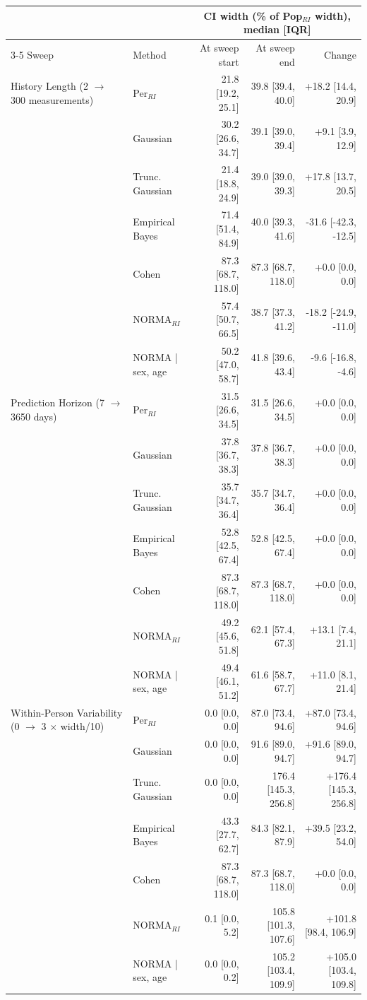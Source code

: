 \begin{table}[ht]
\centering
\footnotesize
\begin{tabular}{llrrr}
\toprule
\multicolumn{2}{l}{} & \multicolumn{3}{c}{CI width (\% of Pop$_{RI}$ width), median [IQR]} \\
\cmidrule(lr){3-5}
Sweep & Method & At sweep start & At sweep end & Change \\
\midrule
History Length (2 $\to$ 300 measurements) & Per$_{RI}$ & 21.8 [19.2, 25.1] & 39.8 [39.4, 40.0] & +18.2 [14.4, 20.9] \\
 & Gaussian & 30.2 [26.6, 34.7] & 39.1 [39.0, 39.4] & +9.1 [3.9, 12.9] \\
 & Trunc. Gaussian & 21.4 [18.8, 24.9] & 39.0 [39.0, 39.3] & +17.8 [13.7, 20.5] \\
 & Empirical Bayes & 71.4 [51.4, 84.9] & 40.0 [39.3, 41.6] & -31.6 [-42.3, -12.5] \\
 & Cohen & 87.3 [68.7, 118.0] & 87.3 [68.7, 118.0] & +0.0 [0.0, 0.0] \\
 & NORMA$_{RI}$ & 57.4 [50.7, 66.5] & 38.7 [37.3, 41.2] & -18.2 [-24.9, -11.0] \\
 & NORMA | sex, age & 50.2 [47.0, 58.7] & 41.8 [39.6, 43.4] & -9.6 [-16.8, -4.6] \\
\addlinespace
Prediction Horizon (7 $\to$ 3650 days) & Per$_{RI}$ & 31.5 [26.6, 34.5] & 31.5 [26.6, 34.5] & +0.0 [0.0, 0.0] \\
 & Gaussian & 37.8 [36.7, 38.3] & 37.8 [36.7, 38.3] & +0.0 [0.0, 0.0] \\
 & Trunc. Gaussian & 35.7 [34.7, 36.4] & 35.7 [34.7, 36.4] & +0.0 [0.0, 0.0] \\
 & Empirical Bayes & 52.8 [42.5, 67.4] & 52.8 [42.5, 67.4] & +0.0 [0.0, 0.0] \\
 & Cohen & 87.3 [68.7, 118.0] & 87.3 [68.7, 118.0] & +0.0 [0.0, 0.0] \\
 & NORMA$_{RI}$ & 49.2 [45.6, 51.8] & 62.1 [57.4, 67.3] & +13.1 [7.4, 21.1] \\
 & NORMA | sex, age & 49.4 [46.1, 51.2] & 61.6 [58.7, 67.7] & +11.0 [8.1, 21.4] \\
\addlinespace
Within-Person Variability (0 $\to$ 3 $\times$ width/10) & Per$_{RI}$ & 0.0 [0.0, 0.0] & 87.0 [73.4, 94.6] & +87.0 [73.4, 94.6] \\
 & Gaussian & 0.0 [0.0, 0.0] & 91.6 [89.0, 94.7] & +91.6 [89.0, 94.7] \\
 & Trunc. Gaussian & 0.0 [0.0, 0.0] & 176.4 [145.3, 256.8] & +176.4 [145.3, 256.8] \\
 & Empirical Bayes & 43.3 [27.7, 62.7] & 84.3 [82.1, 87.9] & +39.5 [23.2, 54.0] \\
 & Cohen & 87.3 [68.7, 118.0] & 87.3 [68.7, 118.0] & +0.0 [0.0, 0.0] \\
 & NORMA$_{RI}$ & 0.1 [0.0, 5.2] & 105.8 [101.3, 107.6] & +101.8 [98.4, 106.9] \\
 & NORMA | sex, age & 0.0 [0.0, 0.2] & 105.2 [103.4, 109.9] & +105.0 [103.4, 109.8] \\
\bottomrule
\end{tabular}
\label{tab:06_sensitivity_summary}
\end{table}